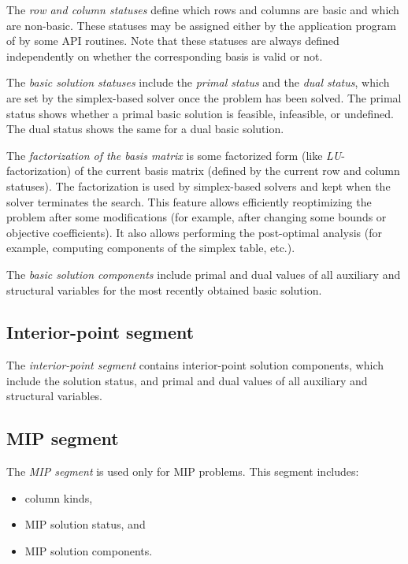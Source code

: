 \vspace*{-8pt}

The {\it row and column statuses} define which rows and columns are
basic and which are non-basic. These statuses may be assigned either by
the application program of by some API routines. Note that these
statuses are always defined independently on whether the corresponding
basis is valid or not.

The {\it basic solution statuses} include the {\it primal status} and
the {\it dual status}, which are set by the simplex-based solver once
the problem has been solved. The primal status shows whether a primal
basic solution is feasible, infeasible, or undefined. The dual status
shows the same for a dual basic solution.

The {\it factorization of the basis matrix} is some factorized form
(like {\it LU}-factorization) of the current basis matrix (defined by
the current row and column statuses). The factorization is used by
simplex-based solvers and kept when the solver terminates the search.
This feature allows efficiently reoptimizing the problem after some
modifications (for example, after changing some bounds or objective
coefficients). It also allows performing the post-optimal analysis (for
example, computing components of the simplex table, etc.).

The {\it basic solution components} include primal and dual values of
all auxiliary and structural variables for the most recently obtained
basic solution.

\subsection{Interior-point segment}

The {\it interior-point segment} contains interior-point solution
components, which include the solution status, and primal and dual
values of all auxiliary and structural variables.

\subsection{MIP segment}

The {\it MIP segment} is used only for MIP problems. This segment
includes:

\vspace*{-8pt}

\begin{itemize}\setlength{\itemsep}{0pt}
\item column kinds,

\item MIP solution status, and

\item MIP solution components.
\end{itemize}

